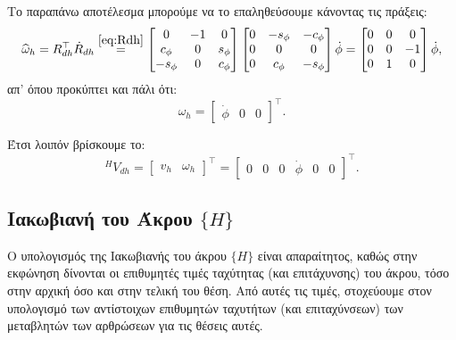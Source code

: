 \documentclass[12pt]{article} %
\numberwithin{equation}{section}  %
\begin{document}
\begin{itemize}
    Το παραπάνω αποτέλεσμα μπορούμε να το επαληθεύσουμε κάνοντας τις πράξεις:
    \begin{equation}
        \widehat{\omega}_h = R_{dh}^{\top} \dot{R}_{dh} \overset{\eqref{eq:Rdh}}{=} 
        \begin{bmatrix}
            0          &  -1  &  0  \\
            c_{\phi}   &  0   &  s_{\phi}  \\
            -s_{\phi}  &  0   &  c_{\phi}
        \end{bmatrix}
        \begin{bmatrix}
            0    &  -s_{\phi}  & -c_{\phi} \\
            0    &  0         &  0    \\
            0    &  c_{\phi}  &  -s_{\phi}
        \end{bmatrix} \dot\phi = 
        \begin{bmatrix}
            0    &  0    &  0 \\
            0    &  0    &  -1    \\
            0    &  1    &  0
        \end{bmatrix} \dot\phi,
    \end{equation}
    απ' όπου προκύπτει και πάλι ότι:
    \begin{equation}\label{eq:omegaH}
        \omega_h = \begin{bmatrix}
            \dot\phi  & 0  &  0
        \end{bmatrix}^{\top}.
    \end{equation}
    
\end{itemize}

Έτσι λοιπόν βρίσκουμε το: 
\begin{equation}\label{eq:Vdh_H}
    ^{H}V_{dh} = \begin{bmatrix} v_h & \omega_h\end{bmatrix}^{\top} = \begin{bmatrix} 0 & 0 & 0 & \dot\phi & 0 & 0 \end{bmatrix}^{\top}.
\end{equation}


\subsection{Ιακωβιανή του Άκρου $\{H\}$}
Ο υπολογισμός της Ιακωβιανής του άκρου $\{H\}$ είναι απαραίτητος, καθώς στην εκφώνηση δίνονται οι επιθυμητές τιμές ταχύτητας (και επιτάχυνσης) του άκρου, τόσο στην αρχική όσο και στην τελική του θέση. 
Από αυτές τις τιμές, στοχεύουμε στον υπολογισμό των αντίστοιχων επιθυμητών ταχυτήτων (και επιταχύνσεων) των μεταβλητών των αρθρώσεων για τις θέσεις αυτές.
\end{document}
